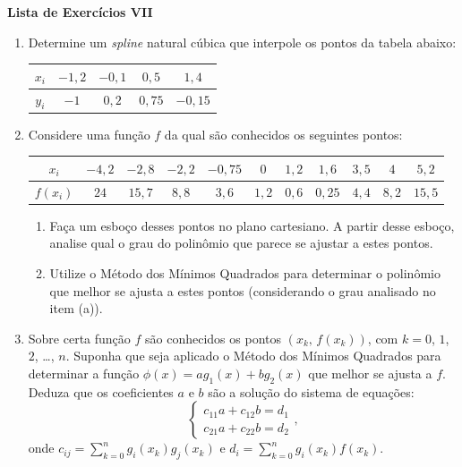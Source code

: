 \documentclass[12pt,a4paper]{article}
\begin{document}
\begin{center}
 \textbf{Lista de Exercícios VII}
\end{center}

\begin{enumerate}
  
  \item Determine um \textit{spline} natural cúbica que interpole os pontos da tabela abaixo:

   \begin{center}
   \begin{tabular}{c|c|c|c|c}
      $x_i$ & $-1,2$ & $-0,1$ & $0,5$ & $1,4$ \\ \hline
      $y_i$ & $-1$ & $0,2$ & $0,75$ & $-0,15$
   \end{tabular}
   \end{center}

  \item Considere uma função $f$ da qual são conhecidos os seguintes pontos:

   \begin{center}
   \begin{tabular}{c|c|c|c|c|c|c|c|c|c|c}
      $x_i$ & $-4,2$ & $-2,8$ & $-2,2$ & $-0,75$ & $0$ & $1,2$ & $1,6$ & $3,5$ & $4$ & $5,2$\\ \hline
      $f(x_i)$ & $24$ & $15,7$ & $8,8$ & $3,6$ & $1,2$ & $0,6$ & $0,25$ & $4,4$ & $8,2$ & $15,5$
   \end{tabular}
   \end{center}

   \begin{enumerate}
    \item Faça um esboço desses pontos no plano cartesiano. A partir desse esboço, analise qual o grau do polinômio que 
          parece se ajustar a estes pontos.
    \item Utilize o Método dos Mínimos Quadrados para determinar o polinômio que melhor se ajusta a estes pontos (considerando o grau analisado
          no item (a)).
   \end{enumerate}
 
\item Sobre certa função $f$ são conhecidos os pontos $(x_k,\,f(x_k))$, com $k=0$, $1$, $2$, \ldots, $n$. Suponha que seja 
aplicado o Método dos Mínimos Quadrados para determinar a função $\phi(x) = ag_1(x) + bg_2(x)$ que melhor se ajusta a $f$. Deduza que os coeficientes $a$ e 
$b$ são a solução do sistema de equações:
$$\begin{cases}
   c_{11}a + c_{12}b = d_1 \\
   c_{21}a + c_{22}b = d_2
  \end{cases},
$$
onde $\displaystyle c_{ij} = \sum_{k=0}^n g_i(x_k)g_j(x_k)$ e $\displaystyle d_{i} = \sum_{k=0}^n g_i(x_k)f(x_k)$.


\end{enumerate}
\end{document}
